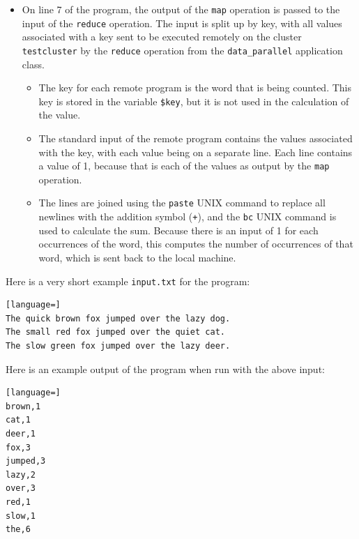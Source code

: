 \documentclass[oneside]{report}
\begin{document}
\begin{itemize}
  \item
        On line 7 of the program, the output of the \texttt{map} operation is passed to the input of the \texttt{reduce} operation. The input is split up by key, with all values associated with a key sent to be executed remotely on the cluster \texttt{testcluster} by the \texttt{reduce} operation from the \texttt{data\_parallel} application class.
        \begin{itemize}
          \item The key for each remote program is the word that is being counted. This key is stored in the variable \texttt{\$key}, but it is not used in the calculation of the value.
          \item The standard input of the remote program contains the values associated with the key, with each value being on a separate line. Each line contains a value of 1, because that is each of the values as output by the \texttt{map} operation.
          \item The lines are joined using the \texttt{paste} UNIX command to replace all newlines with the addition symbol (\texttt{+}), and the \texttt{bc} UNIX command is used to calculate the sum.
                Because there is an input of 1 for each occurrences of the word, this computes the number of occurrences of that word, which is sent back to the local machine.
        \end{itemize}
\end{itemize}

Here is a very short example \texttt{input.txt} for the program:

\begin{minipage}[c]{\textwidth-15pt}
  \begin{lstlisting}[language=]
The quick brown fox jumped over the lazy dog.
The small red fox jumped over the quiet cat.
The slow green fox jumped over the lazy deer.
\end{lstlisting}
  \smallskip
\end{minipage}

Here is an example output of the program when run with the above input:

\begin{minipage}[c]{\textwidth-15pt}
  \begin{lstlisting}[language=]
brown,1
cat,1
deer,1
fox,3
jumped,3
lazy,2
over,3
red,1
slow,1
the,6
\end{lstlisting}
  \smallskip
\end{minipage}
\end{document}
